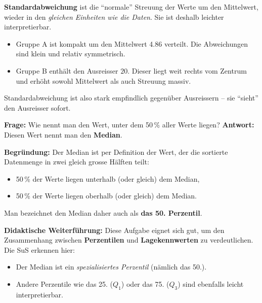 \begin{aufgabe}{2}
\textbf{Standardabweichung} ist die ``normale'' Streuung der Werte um den Mittelwert, wieder in den \emph{gleichen Einheiten wie die Daten}. Sie ist deshalb leichter interpretierbar.

\begin{itemize}
  \item Gruppe A ist kompakt um den Mittelwert 4.86 verteilt. Die Abweichungen sind klein und relativ symmetrisch.
  \item Gruppe B enthält den Ausreisser $20$. Dieser liegt weit rechts vom Zentrum und erhöht sowohl Mittelwert als auch Streuung massiv.
\end{itemize}

Standardabweichung ist also stark empfindlich gegenüber Ausreissern – sie ``sieht'' den Ausreisser sofort.

\end{aufgabe}

\begin{aufgabe}{3}

\textbf{Frage:} Wie nennt man den Wert, unter dem 50 \% aller Werte liegen?
\textbf{Antwort:} Diesen Wert nennt man den \textbf{Median}.

\textbf{Begründung:} Der Median ist per Definition der Wert, der die sortierte Datenmenge in zwei gleich grosse Hälften teilt:

\begin{itemize}
  \item 50 \% der Werte liegen unterhalb (oder gleich) dem Median,
  \item 50 \% der Werte liegen oberhalb (oder gleich) dem Median.
\end{itemize}

Man bezeichnet den Median daher auch als \textbf{das 50. Perzentil}.

\textbf{Didaktische Weiterführung:} Diese Aufgabe eignet sich gut, um den Zusammenhang zwischen \textbf{Perzentilen} und \textbf{Lagekennwerten} zu verdeutlichen. Die SuS erkennen hier:

\begin{itemize}
  \item Der Median ist ein \emph{spezialisiertes Perzentil} (nämlich das 50.).
  \item Andere Perzentile wie das 25. ($Q_1$) oder das 75. ($Q_3$) sind ebenfalls leicht interpretierbar.
\end{itemize}

\end{aufgabe}

